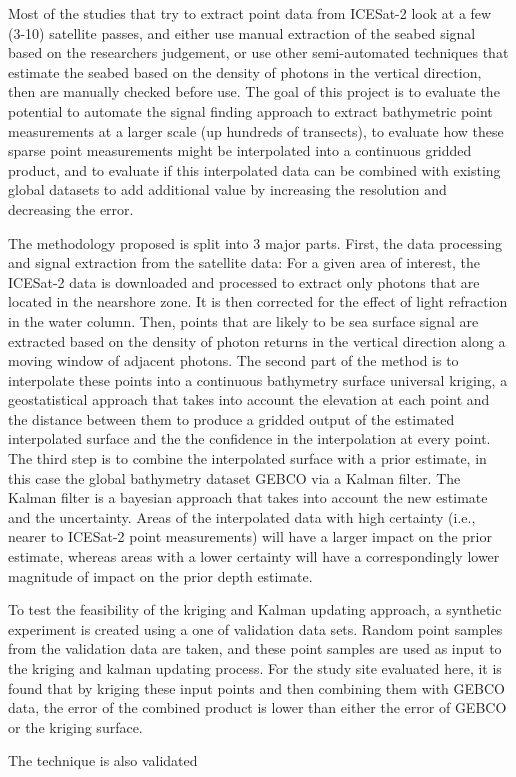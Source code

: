 Most of the studies that try to extract point data from ICESat-2 look at a few (3-10) satellite passes, and either use manual extraction of the seabed signal based on the researchers judgement, or use other semi-automated techniques that estimate the seabed based on the density of photons in the vertical direction, then are manually checked before use. The goal of this project is to evaluate the potential to automate the signal finding approach to extract bathymetric point measurements at a larger scale (up hundreds of transects), to evaluate how these sparse point measurements might be interpolated into a continuous gridded product, and to evaluate if this interpolated data can be combined with existing global datasets to add additional value by increasing the resolution and decreasing the error. 

The methodology proposed is split into 3 major parts. First, the data processing and signal extraction from the satellite data: For a given area of interest, the ICESat-2 data is downloaded and processed to extract only photons that are located in the nearshore zone. It is then corrected for the effect of light refraction in the water column. Then, points that are likely to be sea surface signal are extracted based on the density of photon returns in the vertical direction along a moving window of adjacent photons. The second part of the method is to interpolate these points into a continuous bathymetry surface universal kriging, a geostatistical approach that takes into account the elevation at each point and the distance between them to produce a gridded output of the estimated interpolated surface and the the confidence in the interpolation at every point. The third step is to combine the interpolated surface with a prior estimate, in this case the global bathymetry dataset GEBCO via a Kalman filter. The Kalman filter is a bayesian approach that takes into account the new estimate and the uncertainty. Areas of the interpolated data with high certainty (i.e., nearer to ICESat-2 point measurements) will have a larger impact on the prior estimate, whereas areas with a lower certainty will have a correspondingly lower magnitude of impact on the prior depth estimate.

To test the feasibility of the kriging and Kalman updating approach, a synthetic experiment is created using a one of validation data sets. Random point samples from the validation data are taken, and these point samples are used as input to the kriging and kalman updating process. For the study site evaluated here, it is found that by kriging these input points and then combining them with GEBCO data, the error of the combined product is lower than either the error of GEBCO or the kriging surface. 

The technique is also validated 